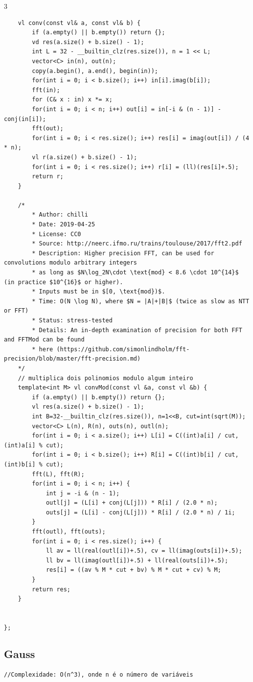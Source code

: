 \documentclass[9pt, a4paper, notitlepage]{extreport}
\begin{document}
\begin{multicols}{3}
\begin{verbatim}
    vl conv(const vl& a, const vl& b) {
        if (a.empty() || b.empty()) return {};
        vd res(a.size() + b.size() - 1);
        int L = 32 - __builtin_clz(res.size()), n = 1 << L;
        vector<C> in(n), out(n);
        copy(a.begin(), a.end(), begin(in));
        for(int i = 0; i < b.size(); i++) in[i].imag(b[i]);
        fft(in);
        for (C& x : in) x *= x;
        for(int i = 0; i < n; i++) out[i] = in[-i & (n - 1)] - conj(in[i]);
        fft(out);
        for(int i = 0; i < res.size(); i++) res[i] = imag(out[i]) / (4 * n);
        vl r(a.size() + b.size() - 1);
        for(int i = 0; i < res.size(); i++) r[i] = (ll)(res[i]+.5);
        return r;
    }
 
    /*
        * Author: chilli
        * Date: 2019-04-25
        * License: CC0
        * Source: http://neerc.ifmo.ru/trains/toulouse/2017/fft2.pdf
        * Description: Higher precision FFT, can be used for convolutions modulo arbitrary integers
        * as long as $N\log_2N\cdot \text{mod} < 8.6 \cdot 10^{14}$ (in practice $10^{16}$ or higher).
        * Inputs must be in $[0, \text{mod})$.
        * Time: O(N \log N), where $N = |A|+|B|$ (twice as slow as NTT or FFT)
        * Status: stress-tested
        * Details: An in-depth examination of precision for both FFT and FFTMod can be found
        * here (https://github.com/simonlindholm/fft-precision/blob/master/fft-precision.md)
    */
    // multiplica dois polinomios modulo algum inteiro
    template<int M> vl convMod(const vl &a, const vl &b) {
        if (a.empty() || b.empty()) return {};
        vl res(a.size() + b.size() - 1);
        int B=32-__builtin_clz(res.size()), n=1<<B, cut=int(sqrt(M));
        vector<C> L(n), R(n), outs(n), outl(n);
        for(int i = 0; i < a.size(); i++) L[i] = C((int)a[i] / cut, (int)a[i] % cut);
        for(int i = 0; i < b.size(); i++) R[i] = C((int)b[i] / cut, (int)b[i] % cut);
        fft(L), fft(R);
        for(int i = 0; i < n; i++) {
            int j = -i & (n - 1);
            outl[j] = (L[i] + conj(L[j])) * R[i] / (2.0 * n);
            outs[j] = (L[i] - conj(L[j])) * R[i] / (2.0 * n) / 1i;
        }
        fft(outl), fft(outs);
        for(int i = 0; i < res.size(); i++) {
            ll av = ll(real(outl[i])+.5), cv = ll(imag(outs[i])+.5);
            ll bv = ll(imag(outl[i])+.5) + ll(real(outs[i])+.5);
            res[i] = ((av % M * cut + bv) % M * cut + cv) % M;
        }
        return res;
    }
 

};
\end{verbatim}

\subsection{Gauss}
\begin{verbatim}
//Complexidade: O(n^3), onde n é o número de variáveis


\end{verbatim}
\end{multicols}
\end{document}
